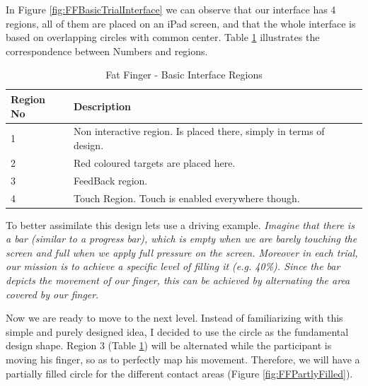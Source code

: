 In Figure \ref{fig:FFBasicTrialInterface} we can observe that our interface has 4 regions, all of them are placed on an iPad screen, and that the whole interface is based on overlapping circles with common center. Table \ref{tab:ffRegions} illustrates the correspondence between Numbers and regions.

\begin{table}[h]
\centering
\begin{tabular}{l || l }
Region No & Description \\
\hline
1 &  Non interactive region. Is placed there, simply in terms of design.\\
2 &  Red coloured targets are placed here.\\
3 &  FeedBack region.\\
4 &  Touch Region. Touch is enabled everywhere though.
\end{tabular}
\caption{Fat Finger - Basic Interface Regions}
\label{tab:ffRegions}
\end{table}

To better assimilate this design lets use a driving example. \emph{Imagine that there is a bar (similar to a progress bar), which is empty when we are barely touching the screen and full when we apply full pressure on the screen. Moreover in each trial, our mission is to achieve a specific level of filling it (e.g. 40\%). Since the bar depicts the movement of our finger, this can be achieved by alternating the area covered by our finger}. 

Now we are ready to move to the next level. Instead of familiarizing with this simple and purely designed idea, I decided to use the circle as the fundamental design shape. Region 3 (Table \ref{tab:ffRegions}) will be alternated while the participant is moving his finger, so as to perfectly map his movement. Therefore, we will have a partially filled circle for the different contact areas (Figure \ref{fig:FFPartlyFilled}).

